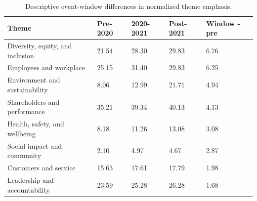 \begin{table}[htbp]
\centering
\caption{Descriptive event-window differences in normalized theme emphasis.}
\label{tab:event_window_theme_changes}
\begin{tabular}{lllll}
\hline
Theme & Pre-2020 & 2020-2021 & Post-2021 & Window - pre \\
\hline
Diversity, equity, and inclusion & 21.54 & 28.30 & 29.83 & 6.76 \\
Employees and workplace & 25.15 & 31.40 & 29.83 & 6.25 \\
Environment and sustainability & 8.06 & 12.99 & 21.71 & 4.94 \\
Shareholders and performance & 35.21 & 39.34 & 40.13 & 4.13 \\
Health, safety, and wellbeing & 8.18 & 11.26 & 13.08 & 3.08 \\
Social impact and community & 2.10 & 4.97 & 4.67 & 2.87 \\
Customers and service & 15.63 & 17.61 & 17.79 & 1.98 \\
Leadership and accountability & 23.59 & 25.28 & 26.28 & 1.68 \\
\hline
\end{tabular}
\end{table}
